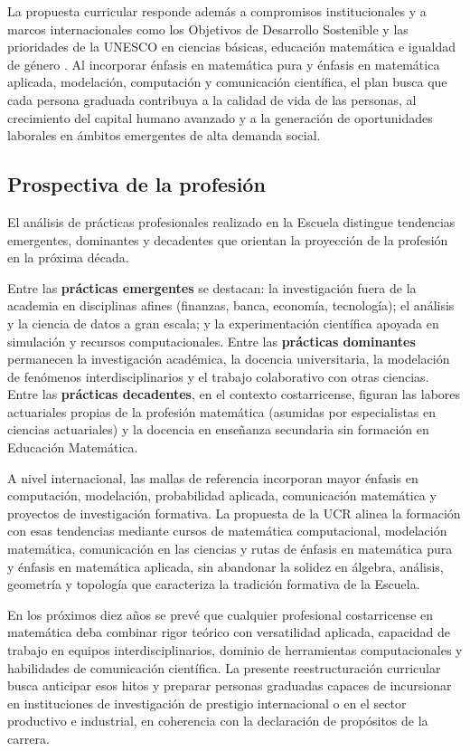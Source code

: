 La propuesta curricular responde además a compromisos institucionales y a marcos internacionales como los Objetivos de Desarrollo Sostenible y las prioridades de la UNESCO en ciencias básicas, educación matemática e igualdad de género \cite{UNESCO2020IDM}. Al incorporar énfasis en matemática pura y énfasis en matemática aplicada, modelación, computación y comunicación científica, el plan busca que cada persona graduada contribuya a la calidad de vida de las personas, al crecimiento del capital humano avanzado y a la generación de oportunidades laborales en ámbitos emergentes de alta demanda social.


\subsection{Prospectiva de la profesión}

El análisis de prácticas profesionales realizado en la Escuela distingue tendencias emergentes, dominantes y decadentes que orientan la proyección de la profesión en la próxima década.

Entre las \textbf{prácticas emergentes} se destacan: la investigación fuera de la academia en disciplinas afines (finanzas, banca, economía, tecnología); el análisis y la ciencia de datos a gran escala; y la experimentación científica apoyada en simulación y recursos computacionales. Entre las \textbf{prácticas dominantes} permanecen la investigación académica, la docencia universitaria, la modelación de fenómenos interdisciplinarios y el trabajo colaborativo con otras ciencias. Entre las \textbf{prácticas decadentes}, en el contexto costarricense, figuran las labores actuariales propias de la profesión matemática (asumidas por especialistas en ciencias actuariales) y la docencia en enseñanza secundaria sin formación en Educación Matemática.

A nivel internacional, las mallas de referencia incorporan mayor énfasis en computación, modelación, probabilidad aplicada, comunicación matemática y proyectos de investigación formativa. La propuesta de la UCR alinea la formación con esas tendencias mediante cursos de matemática computacional, modelación matemática, comunicación en las ciencias y rutas de énfasis en matemática pura y énfasis en matemática aplicada, sin abandonar la solidez en álgebra, análisis, geometría y topología que caracteriza la tradición formativa de la Escuela.

En los próximos diez años se prevé que cualquier profesional costarricense en matemática deba combinar rigor teórico con versatilidad aplicada, capacidad de trabajo en equipos interdisciplinarios, dominio de herramientas computacionales y habilidades de comunicación científica. La presente reestructuración curricular busca anticipar esos hitos y preparar personas graduadas capaces de incursionar en instituciones de investigación de prestigio internacional o en el sector productivo e industrial, en coherencia con la declaración de propósitos de la carrera.
